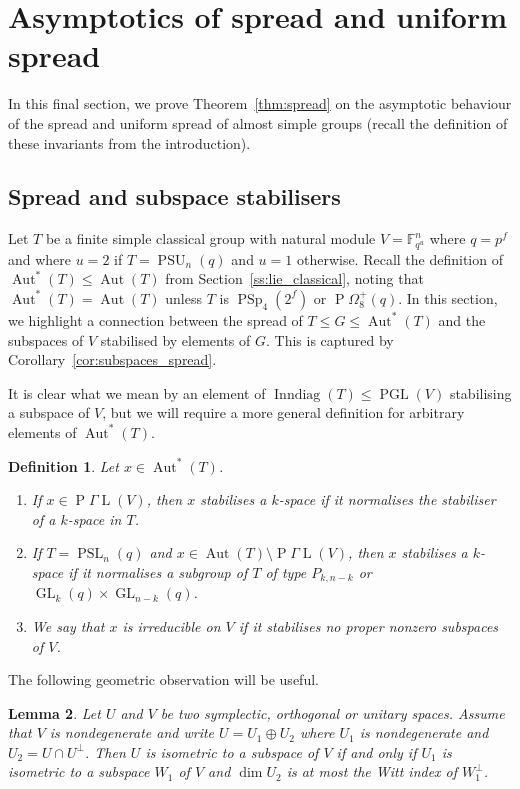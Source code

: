 \documentclass[11pt]{article}
\numberwithin{equation}{section}
\theoremstyle{shdefinition}
\newtheorem{definition}{Definition}[section]
\theoremstyle{shplain}
\newtheorem{lemma}[definition]{Lemma}
\newcommand{\<}{\langle}
\renewcommand{\>}{\rangle}
\renewcommand{\leq}{\leqslant}
\newcommand{\Aut}{\operatorname{Aut}}
\newcommand{\Inndiag}{\operatorname{Inndiag}}
\newcommand{\F}{\mathbb{F}}
\renewcommand{\:}{\colon}
\newcommand{\GL}{\operatorname{GL}}
\newcommand{\PSL}{\operatorname{PSL}}
\newcommand{\PGL}{\operatorname{PGL}}
\newcommand{\PGaL}{\operatorname{P}\!\Gamma\!\operatorname{L}}
\newcommand{\PSp}{\operatorname{PSp}}
\newcommand{\PSU}{\operatorname{PSU}}
\newcommand{\Om}{\Omega}
\newcommand{\POm}{\operatorname{P}\!\Om}
\begin{document}
\section{Asymptotics of spread and uniform spread} \label{s:spread}

In this final section, we prove Theorem~\ref{thm:spread} on the asymptotic behaviour of the spread and uniform spread of almost simple groups (recall the definition of these invariants from the introduction).

\subsection{Spread and subspace stabilisers} \label{ss:subspaces_spread}

Let $T$ be a finite simple classical group with natural module $V = \F_{q^u}^n$ where $q=p^f$ and where $u=2$ if $T = \PSU_n(q)$ and $u=1$ otherwise. Recall the definition of $\Aut^*(T) \leq \Aut(T)$ from Section~\ref{ss:lie_classical}, noting that $\Aut^*(T) = \Aut(T)$ unless $T$ is $\PSp_4(2^f)$ or $\POm^+_8(q)$. In this section, we highlight a connection between the spread of $T \leq G \leq \Aut^*(T)$ and the subspaces of $V$ stabilised by elements of $G$. This is captured by Corollary~\ref{cor:subspaces_spread}. 

It is clear what we mean by an element of $\Inndiag(T) \leq \PGL(V)$ stabilising a subspace of $V$, but we will require a more general definition for arbitrary elements of $\Aut^*(T)$. 

\begin{definition}
Let $x \in \Aut^*(T)$.
\begin{enumerate}
\item If $x \in \PGaL(V)$, then $x$ \emph{stabilises} a $k$-space if it normalises the stabiliser of a $k$-space in $T$.
\item If $T = \PSL_n(q)$ and $x \in \Aut(T) \setminus \PGaL(V)$, then $x$ \emph{stabilises} a $k$-space if it normalises a subgroup of $T$ of type $P_{k,n-k}$ or $\GL_k(q) \times \GL_{n-k}(q)$.
\item We say that $x$ is \emph{irreducible} on $V$ if it stabilises no proper nonzero subspaces of $V$.
\end{enumerate}
\end{definition}

The following geometric observation will be useful.

\begin{lemma} \label{lem:embedding}
Let $U$ and $V$ be two symplectic, orthogonal or unitary spaces. Assume that $V$ is nondegenerate and write $U = U_1 \oplus U_2$ where $U_1$ is nondegenerate and $U_2 = U \cap U^\perp$. Then $U$ is isometric to a subspace of $V$ if and only if $U_1$ is isometric to a subspace $W_1$ of $V$ and $\dim{U_2}$ is at most the Witt index of $W_1^\perp$.
\end{lemma}
\end{document}
